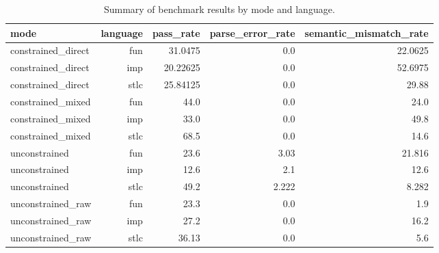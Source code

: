 \begin{table}[htbp]
  \centering
  \caption{Summary of benchmark results by mode and language.}
  \label{tab:summary}
  \begin{tabular}{lrrrr}
    \toprule
    mode & language & pass_rate & parse_error_rate & semantic_mismatch_rate \\
    \midrule
    constrained_direct & fun & 31.0475 & 0.0 & 22.0625 \\
    constrained_direct & imp & 20.22625 & 0.0 & 52.6975 \\
    constrained_direct & stlc & 25.84125 & 0.0 & 29.88 \\
    constrained_mixed & fun & 44.0 & 0.0 & 24.0\\
    constrained_mixed & imp & 33.0& 0.0 & 49.8 \\
    constrained_mixed & stlc & 68.5 & 0.0 & 14.6 \\
    unconstrained & fun & 23.6 & 3.03 & 21.816 \\
    unconstrained & imp & 12.6 & 2.1 & 12.6 \\
    unconstrained & stlc & 49.2& 2.222 & 8.282 \\
    unconstrained_raw & fun & 23.3 & 0.0 & 1.9 \\
    unconstrained_raw & imp & 27.2& 0.0 & 16.2\\
    unconstrained_raw & stlc & 36.13 & 0.0 & 5.6 \\
    \bottomrule
  \end{tabular}
\end{table}